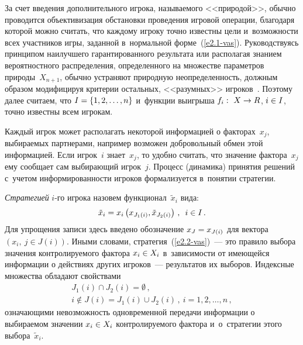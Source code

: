 \begin{multicols}{2}
    За счет введения дополнительного игрока, называемого <<природой>>, обычно
проводится объ\-ективизация обстановки проведения игровой операции, благодаря
которой можно считать, что каждо\-му игроку точно известны цели и~возможности
всех участников игры, заданной в~нормальной форме~(\ref{e2.1-vas}).
Руководствуясь принципом наилучшего гарантированного результата или
располагая знанием вероятностного распределения, определенного на множестве
параметров природы~$X_{n+1}$, обычно устраняют природную неопределенность,
должным образом модифицируя критерии остальных, <<разумных>>
игроков~\cite{1-vas}. Поэтому далее считаем, что $I\hm= \{1,2,\ldots, n\}$ и~функции
выигрыша $f_i:\ X\hm\to R$, $i\hm\in I$, точно известны всем игрокам.

    Каждый игрок может располагать некоторой информацией о факторах~$x_j$,
выбираемых партнерами, например возможен добровольный обмен этой
информацией. Если игрок~$i$ знает~$x_j$, то удобно считать, что значение
фактора~$x_j$ ему сообщает сам выбирающий игрок~$j$. Процесс (динамика)
принятия решений с~учетом информированности игроков формализуется в~понятии
стратегии.

    \textit{Стратегией} $i$-го игрока назовем функционал~$\tilde{x}_i$ вида:
    \begin{equation}
    \tilde{x}_i= x_i\left( x_{J_1(i)}, \tilde{x}_{J_2(i)}\right)\,,\enskip i\in I\,.
    \label{e2.2-vas}
    \end{equation}
Для упрощения записи здесь введено обозначение $x_J\hm= x_{J(i)}$ для вектора
$(x_i,\ j\in J(i))$. Иными словами, стратегия~(\ref{e2.2-vas})~--- это правило выбора
значения контролируемого фактора $x_i\hm\in X_i$ в~зависимости от имеющейся
информации о действиях других игроков~--- результатов их выборов. Индексные
множества обладают свойствами
\begin{multline*}
J_1(i)\cap  J_2(i)=\emptyset\,,\\
 i\not\in J(i) =J_1(i)\cup J_2(i)\,,\ i=1,2,\ldots, n\,,
\end{multline*}
означающими невозможность одновременной передачи информации о выбираемом
значении $x_i\hm\in X_i$ контролируемого фактора и~о~стратегии этого
выбора~$\tilde{x}_i$.


\end{multicols}
